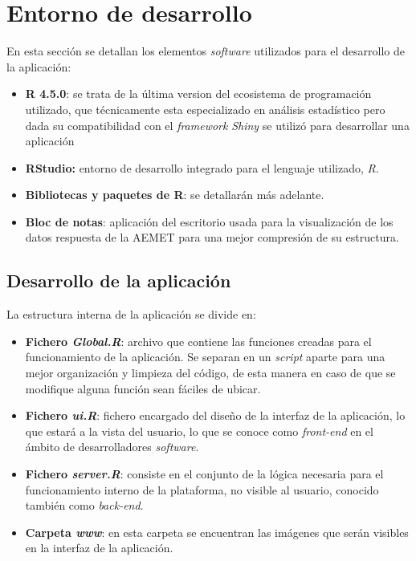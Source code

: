 \section{Entorno de desarrollo}
En esta sección se detallan  los elementos \textit{software} utilizados para el desarrollo de  la aplicación:
\begin{itemize}
    \item \textbf{R 4.5.0}: se trata de la última version del ecosistema de programación utilizado, que técnicamente esta especializado en análisis estadístico pero dada su compatibilidad con el \textit{framework} \textit{Shiny} se utilizó para desarrollar una aplicación
    \item \textbf{RStudio:} entorno de desarrollo integrado para el lenguaje utilizado, \textit{R}.
    \item \textbf{Bibliotecas y paquetes de R}: se detallarán más adelante.
    \item \textbf{Bloc de notas}: aplicación del escritorio usada para la visualización de los datos respuesta de la AEMET para una mejor compresión de su estructura.
\end{itemize}
\subsection{Desarrollo de la aplicación}
La estructura interna de la aplicación se divide en:
\begin{itemize}
    \item \textbf{Fichero \textit{Global.R}}: archivo que contiene las funciones creadas para el funcionamiento de la aplicación. Se separan en un \textit{script} aparte para una mejor organización y limpieza del código, de esta manera en caso de que se modifique alguna función sean fáciles de ubicar.
    \item \textbf{Fichero\textit{ ui.R}}: fichero encargado del diseño de la interfaz de la aplicación, lo que estará a la vista del usuario, lo que se conoce como \textit{front-end} en el ámbito de desarrolladores \textit{software}.
    \item \textbf{Fichero \textit{server.R}}: consiste en el conjunto de la lógica necesaria para el funcionamiento interno de la plataforma, no visible al usuario, conocido también como \textit{back-end}.
    \item \textbf{Carpeta \textit{www}}: en esta carpeta se encuentran las imágenes que serán visibles en la interfaz de la aplicación.
\end{itemize}

